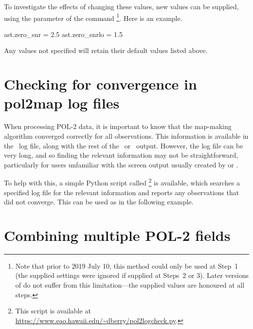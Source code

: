 To investigate the effects of changing these values, new values can be supplied, using the
 parameter of the  command \footnote{Note that prior
to 2019 July 10, this method could only be used at Step~1 (the supplied settings were ignored
if supplied at Steps~2 or 3). Later versions of  do not suffer from this
limitation---the supplied values are honoured at all steps.}.  Here is an
example.

\begin{terminalv}
ast.zero_snr = 2.5
ast.zero_snrlo = 1.5
\end{terminalv}

Any values not specified will retain their default values listed above.


\section{Checking for convergence in pol2map log files}

When processing POL-2 data, it is important to know that the map-making algorithm converged
correctly for all observations. This information is available in the \poltwomap\ log file, along with
the rest of the \makemap\ or \skyloop\ output.  However, the log file can be very long, and
so finding the relevant information may not be straightforward, particularly for users unfamiliar
with the screen output usually created by  or .

To help with this, a simple Python script called
\footnote{This script is available at
\url{https://www.eao.hawaii.edu/~dberry/pol2logcheck.py}.} is available, which
searches a specified  log file for the relevant information and
reports any observations that did not converge. This can be used as in the
following example.



\section{Combining multiple POL-2 fields}

